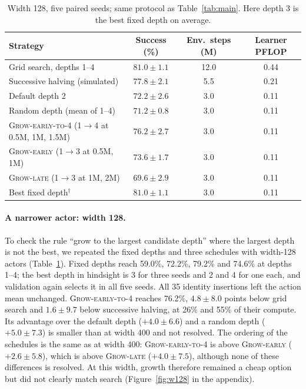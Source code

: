\documentclass{article}
\newcommand{\growE}{\textsc{Grow-early}}
\newcommand{\growL}{\textsc{Grow-late}}
\newcommand{\growF}{\textsc{Grow-early-to-4}}
\begin{document}
\begin{table}[!t]
    \caption{Width 128, five paired seeds; same protocol as Table~\ref{tab:main}. Here depth 3 is the best fixed depth on average.}
    \label{tab:w128}
    \centering
    \small
    \begin{tabular}{lccc}
        \toprule
        Strategy & Success (\%) & Env.\ steps (M) & Learner PFLOP \\
        \midrule
        Grid search, depths 1--4          & $81.0 \pm 1.1$ & 12.0 & 0.44 \\
        Successive halving (simulated)    & $77.8 \pm 2.1$ & 5.5  & 0.21 \\
        Default depth 2                   & $72.2 \pm 2.6$ & 3.0  & 0.11 \\
        Random depth (mean of 1--4)       & $71.2 \pm 0.8$ & 3.0  & 0.11 \\
        \midrule
        \growF{} (1$\to$4 at 0.5M, 1M, 1.5M) & $76.2 \pm 2.7$ & 3.0 & 0.11 \\
        \growE{} (1$\to$3 at 0.5M, 1M)    & $73.6 \pm 1.7$ & 3.0  & 0.11 \\
        \growL{} (1$\to$3 at 1M, 2M)      & $69.6 \pm 2.9$ & 3.0  & 0.11 \\
        \midrule
        Best fixed depth$^\dagger$        & $81.0 \pm 1.1$ & 3.0  & 0.11 \\
        \bottomrule
    \end{tabular}
\end{table}

\paragraph{A narrower actor: width 128.}
To check the rule ``grow to the largest candidate depth'' where the largest depth is not the best, we repeated the fixed depths and three schedules with width-128 actors (Table~\ref{tab:w128}).
Fixed depths reach 59.0\%, 72.2\%, 79.2\% and 74.6\% at depths 1--4; the best depth in hindsight is 3 for three seeds and 2 and 4 for one each, and validation again selects it in all five seeds.
All 35 identity insertions left the action mean unchanged.
\growF{} reaches 76.2\%, $4.8 \pm 8.0$ points below grid search and $1.6 \pm 9.7$ below successive halving, at 26\% and 55\% of their compute.
Its advantage over the default depth ($+4.0 \pm 6.6$) and a random depth ($+5.0 \pm 7.3$) is smaller than at width 400 and not resolved.
The ordering of the schedules is the same as at width 400: \growF{} is above \growE{} ($+2.6 \pm 5.8$), which is above \growL{} ($+4.0 \pm 7.5$), although none of these differences is resolved.
At this width, growth therefore remained a cheap option but did not clearly match search (Figure~\ref{fig:w128} in the appendix).
\end{document}
